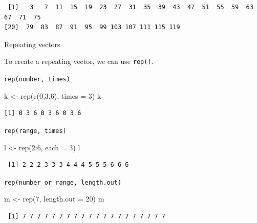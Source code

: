 \documentclass[
  letterpaper,
  DIV=11,
  numbers=noendperiod]{scrreprt}
\newenvironment{Shaded}{\begin{snugshade}}{\end{snugshade}}
\newcommand{\AttributeTok}[1]{\textcolor[rgb]{0.40,0.45,0.13}{#1}}
\newcommand{\DecValTok}[1]{\textcolor[rgb]{0.68,0.00,0.00}{#1}}
\newcommand{\FunctionTok}[1]{\textcolor[rgb]{0.28,0.35,0.67}{#1}}
\newcommand{\NormalTok}[1]{\textcolor[rgb]{0.00,0.23,0.31}{#1}}
\newcommand{\OtherTok}[1]{\textcolor[rgb]{0.00,0.23,0.31}{#1}}
\newcommand{\SpecialCharTok}[1]{\textcolor[rgb]{0.37,0.37,0.37}{#1}}
\begin{document}
\begin{verbatim}
 [1]   3   7  11  15  19  23  27  31  35  39  43  47  51  55  59  63  67  71  75
[20]  79  83  87  91  95  99 103 107 111 115 119
\end{verbatim}

Repeating vectors

To create a repeating vector, we can use \texttt{rep()}.

\texttt{rep(number,\ times)}

\begin{Shaded}
\begin{Highlighting}[]
\NormalTok{k }\OtherTok{\textless{}{-}} \FunctionTok{rep}\NormalTok{(}\FunctionTok{c}\NormalTok{(}\DecValTok{0}\NormalTok{,}\DecValTok{3}\NormalTok{,}\DecValTok{6}\NormalTok{), }\AttributeTok{times =} \DecValTok{3}\NormalTok{)}
\NormalTok{k}
\end{Highlighting}
\end{Shaded}

\begin{verbatim}
[1] 0 3 6 0 3 6 0 3 6
\end{verbatim}

\texttt{rep(range,\ times)}

\begin{Shaded}
\begin{Highlighting}[]
\NormalTok{l }\OtherTok{\textless{}{-}} \FunctionTok{rep}\NormalTok{(}\DecValTok{2}\SpecialCharTok{:}\DecValTok{6}\NormalTok{, }\AttributeTok{each =} \DecValTok{3}\NormalTok{)}
\NormalTok{l}
\end{Highlighting}
\end{Shaded}

\begin{verbatim}
 [1] 2 2 2 3 3 3 4 4 4 5 5 5 6 6 6
\end{verbatim}

\texttt{rep(number\ or\ range,\ length.out)}

\begin{Shaded}
\begin{Highlighting}[]
\NormalTok{m }\OtherTok{\textless{}{-}} \FunctionTok{rep}\NormalTok{(}\DecValTok{7}\NormalTok{, }\AttributeTok{length.out =} \DecValTok{20}\NormalTok{)}
\NormalTok{m}
\end{Highlighting}
\end{Shaded}

\begin{verbatim}
 [1] 7 7 7 7 7 7 7 7 7 7 7 7 7 7 7 7 7 7 7 7
\end{verbatim}
\end{document}
